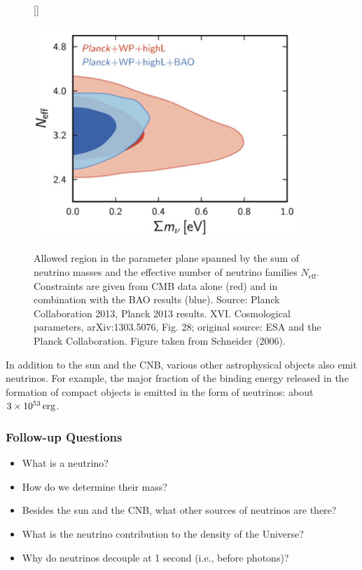 \documentclass[a4paper,11pt]{article}
\begin{document}
\begin{figure}[t]
    [\FBwidth]
    {\caption{\footnotesize{Allowed region in the parameter plane spanned by the sum of neutrino masses and the effective number of neutrino families $N_\mathrm{eff}$. Constraints are given from CMB data alone (red) and in combination with the BAO results (blue). Source: Planck Collaboration 2013, Planck 2013 results. XVI. Cosmological parameters, arXiv:1303.5076, Fig. 28; original source: ESA and the Planck Collaboration. Figure taken from Schneider (2006).}}
    \label{fig:neutrinomasses}}
    {\includegraphics[width=10cm]{figures/neutrinomasses.png}}
\end{figure}

{\noindent}In addition to the sun and the CNB, various other astrophysical objects also emit neutrinos. For example, the major fraction of the binding energy released in the formation of compact objects is emitted in the form of neutrinos: about $3\times10^{53}\,{\rm erg}$.

\newpage
\subsubsection{Follow-up Questions}

\begin{itemize}
    \item What is a neutrino?
    \item How do we determine their mass?
    \item Besides the sun and the CNB, what other sources of neutrinos are there?
    \item What is the neutrino contribution to the density of the Universe?
    \item Why do neutrinos decouple at 1 second (i.e., before photons)?
\end{itemize}
\end{document}
